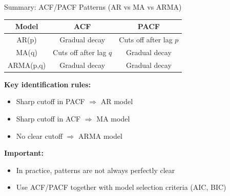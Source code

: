 \documentclass[aspectratio=169]{beamer}
\begin{document}
\begin{frame}{Summary: ACF/PACF Patterns (AR vs MA vs ARMA)}

\begin{center}
\begin{tabular}{|c|c|c|}
\hline
\textbf{Model} & \textbf{ACF} & \textbf{PACF} \\
\hline
AR(p) & Gradual decay & Cuts off after lag $p$ \\
\hline
MA(q) & Cuts off after lag $q$ & Gradual decay \\
\hline
ARMA(p,q) & Gradual decay & Gradual decay \\
\hline
\end{tabular}
\end{center}

\vspace{0.4cm}

\textbf{Key identification rules:}
\begin{itemize}
    \item Sharp cutoff in PACF $\Rightarrow$ AR model
    \item Sharp cutoff in ACF $\Rightarrow$ MA model
    \item No clear cutoff $\Rightarrow$ ARMA model
\end{itemize}

\vspace{0.4cm}

\textbf{Important:}
\begin{itemize}
    \item In practice, patterns are not always perfectly clear
    \item Use ACF/PACF together with model selection criteria (AIC, BIC)
\end{itemize}

\end{frame}
\end{document}
